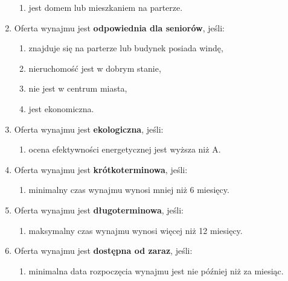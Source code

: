 \begin{enumerate}[label=W\arabic*.]
\begin{enumerate}[label=\arabic*.]
        \item jest domem lub mieszkaniem na parterze.
    \end{enumerate}
    \item Oferta wynajmu jest \textbf{odpowiednia dla seniorów}, jeśli:
    \begin{enumerate}[label=\arabic*.]
        \item znajduje się na parterze lub budynek posiada windę,
        \item nieruchomość jest w dobrym stanie,
        \item nie jest w centrum miasta,
        \item jest ekonomiczna.
    \end{enumerate}
    \item Oferta wynajmu jest \textbf{ekologiczna}, jeśli:
    \begin{enumerate}[label=\arabic*.]
        \item ocena efektywności energetycznej jest wyższa niż A.
    \end{enumerate}
    \item Oferta wynajmu jest \textbf{krótkoterminowa}, jeśli:
    \begin{enumerate}[label=\arabic*.]
        \item minimalny czas wynajmu wynosi mniej niż 6 miesięcy.
    \end{enumerate}
    \item Oferta wynajmu jest \textbf{długoterminowa}, jeśli:
    \begin{enumerate}[label=\arabic*.]
        \item maksymalny czas wynajmu wynosi więcej niż 12 miesięcy.
    \end{enumerate}
    \item Oferta wynajmu jest \textbf{dostępna od zaraz}, jeśli:
    \begin{enumerate}[label=\arabic*.]
        \item minimalna data rozpoczęcia wynajmu jest nie później niż za miesiąc.
    \end{enumerate}
\end{enumerate}


